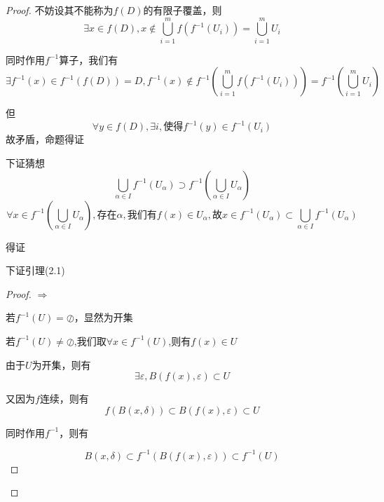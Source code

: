 \documentclass[lang=cn,10pt]{elegantbook}
\begin{document}
\begin{proof}
		不妨设其不能称为$f(D)$的有限子覆盖，则
		\begin{equation*}
			\exists x \in f(D),x\notin \bigcup_{i=1}^m{f(f^{-1}\left( U_i \right))}=\bigcup_{i=1}^m{U_i}
		\end{equation*}
		
		同时作用$f^{-1}$算子，我们有
		\begin{equation*}
			\exists f^{-1}(x)\in f^{-1}(f(D))=D,f^{-1}(x)\notin f^{-1}(\bigcup_{i=1}^m{f(f^{-1}\left( U_i \right))})=f^{-1}(\bigcup_{i=1}^m{U_i})
		\end{equation*}
		
		但
		\begin{equation*}
			\forall y\in f(D),\exists i ,\text{使得}f^{-1}(y)\in f^{-1}(U_{i})
		\end{equation*}
		故矛盾，命题得证
		
		下证猜想
		\begin{equation*}
			\bigcup_{\alpha \in I}{f^{-1}\left( U_{\alpha} \right)}\supset f^{-1}(\bigcup_{\alpha \in I}{U_{\alpha}})
		\end{equation*}
		\begin{equation*}
			\forall x\in f^{-1}(\bigcup_{\alpha \in I}{U_{\alpha}}),\text{存在}\alpha ,\text{我们有}f\left( x \right) \in U_{\alpha},\text{故}x\in f^{-1}\left( U_{\alpha} \right) \subset \bigcup_{\alpha \in I}{f^{-1}\left( U_{\alpha} \right)}
		\end{equation*}
		
		得证
		
		下证引理(2.1)
		\begin{proof}
			
			$\Rightarrow$
			
			若$f^{-1}(U)=\oslash $，显然为开集
			
			若$f^{-1}(U)\ne\oslash $,我们取$\forall x \in f^{-1}(U)$,则有$f(x)\in U$
			
			由于$U$为开集，则有
			\begin{equation*}
				\exists \varepsilon ,B(f(x),\varepsilon)\subset U
			\end{equation*}
			
			又因为$f$连续，则有
			\begin{equation*}
				f\left( B\left( x,\delta \right) \right) \subset B\left( f\left( x \right) ,\varepsilon \right) \subset U
			\end{equation*}
			
			同时作用$f^{-1}$，则有
			
			\begin{equation*}
				B\left( x,\delta \right) \subset f^{-1}\left( B\left( f\left( x \right) ,\varepsilon \right) \right) \subset f^{-1}\left( U \right) 
			\end{equation*}
			

\end{proof}
\end{proof}
\end{document}
